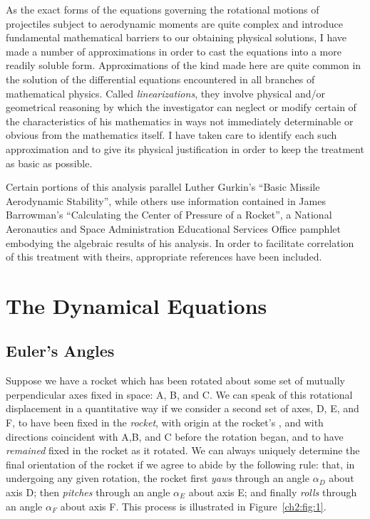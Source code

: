 As the exact forms of the equations governing the rotational motions of
projectiles subject to aerodynamic moments are quite complex and introduce
fundamental mathematical barriers to our obtaining physical solutions, I have
made a number of approximations in order to cast the equations into a more
readily soluble form. Approximations of the kind made here are quite common in
the solution of the differential equations encountered in all branches of
mathematical physics. Called \emph{linearizations}, they involve physical
and/or geometrical reasoning by which the investigator can neglect or modify
certain of the characteristics of his mathematics in ways not immediately
determinable or obvious from the mathematics itself. I have taken care to
identify each such approximation and to give its physical justification in
order to keep the treatment as basic as possible.

Certain portions of this analysis parallel Luther Gurkin's ``Basic Missile
Aerodynamic Stability'', while others use information contained in James
Barrowman's ``Calculating the Center of Pressure of a Rocket'', a National
Aeronautics and Space Administration Educational Services Office pamphlet
embodying the algebraic results of his analysis. In order to facilitate
correlation of this treatment with theirs, appropriate references have been
included.

\section{The Dynamical Equations}\label{ch2:sec:1}

\subsection{Euler's Angles}\label{ch2:sec:1.1}

Suppose we have a rocket which has been rotated about some set of mutually
perpendicular axes fixed in space: A, B, and C. We can speak of this rotational
displacement in a quantitative way if we consider a second set of axes, D, E,
and F, to have been fixed in the \emph{rocket}, with origin at the rocket's
\CG, and with directions coincident with A,B, and C before the rotation began,
and to have \emph{remained} fixed in the rocket as it rotated. We can always
uniquely determine the final orientation of the rocket if we agree to abide by
the following rule: that, in undergoing any given rotation, the rocket first
\emph{yaws} through an angle $\alpha_D$ about axis D; then \emph{pitches}
through an angle $\alpha_E$ about axis E; and finally \emph{rolls} through an
angle $\alpha_F$ about axis F. This process is illustrated in
Figure~\ref{ch2:fig:1}.

